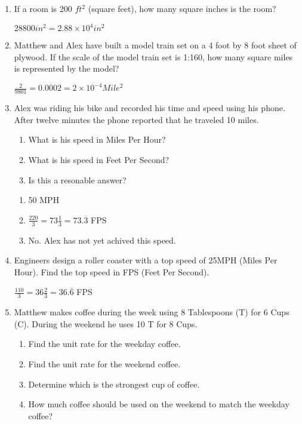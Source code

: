 \documentclass[12pt]{article}
\begin{document}
\begin{enumerate}

\item If a room is 200 \(ft^{2}\) (square feet), how many square inches is the room?

	\( 28800 in^{2} = 2.88 \times 10^{4} in^{2} \)

\item Matthew and Alex have built a model train set on a 4 foot by 8 foot sheet of plywood.  If the scale of the model train set is 1:160, how many square miles is represented by the model?

	\( \frac{2}{9801} = 0.0002 = 2 \times 10^{-4} Mile^{2} \)

\item Alex was riding his bike and recorded his time and speed using his phone.  After twelve minutes the phone reported that he traveled 10 miles.
	\begin{enumerate}
		\item What is his speed in Miles Per Hour?
		\item What is his speed in Feet Per Second?
		\item Is this a resonable answer?
	\end{enumerate}

	\begin{enumerate}
		\item 50 MPH
		\item \( \frac{220}{3} = 73\frac{1}{3} = 73.\overline{3} \) FPS
		\item No.  Alex has not yet achived this speed.
	\end{enumerate}

\item Engineers design a roller coaster with a top speed of 25MPH (Miles Per Hour).  Find the top speed in FPS (Feet Per Second).

	\( \frac{110}{3} = 36\frac{2}{3} = 36.\overline{6} \) FPS

\item Matthew makes coffee during the week using 8 Tablespoons (T) for 6 Cups (C).  During the weekend he uses 10 T for 8 Cups.
	\begin{enumerate}
		\item Find the unit rate for the weekday coffee.
		\item Find the unit rate for the weekend coffee.
		\item Determine which is the strongest cup of coffee.
		\item How much coffee should be used on the weekend to match the weekday coffee?
	\end{enumerate}


\end{enumerate}
\end{document}

